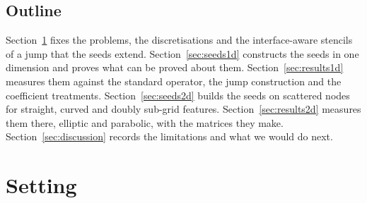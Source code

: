 \documentclass[11pt]{amsart}
\theoremstyle{definition}
\theoremstyle{remark}
\begin{document}
\subsection*{Outline}
Section~\ref{sec:setting} fixes the problems, the discretisations and the
interface-aware stencils of a jump that the seeds extend.
Section~\ref{sec:seeds1d} constructs the seeds in one dimension and proves
what can be proved about them. Section~\ref{sec:results1d} measures them
against the standard operator, the jump construction and the coefficient
treatments. Section~\ref{sec:seeds2d} builds the seeds on scattered nodes
for straight, curved and doubly sub-grid features.
Section~\ref{sec:results2d} measures them there, elliptic and parabolic,
with the matrices they make. Section~\ref{sec:discussion} records the
limitations and what we would do next.

\section{Setting}
\label{sec:setting}
%
\end{document}
